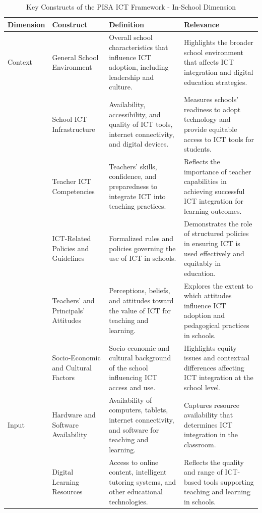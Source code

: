 \documentclass[
]{article}
\begin{document}
\begin{longtable}[l]{>{\raggedright\arraybackslash}p{1.5cm}>{\raggedright\arraybackslash}p{3.5cm}>{\raggedright\arraybackslash}p{5cm}>{\raggedright\arraybackslash}p{5cm}}
\caption{\label{tab:in_school_constructs}Key Constructs of the PISA ICT Framework - In-School Dimension}\\
\toprule
Dimension & Construct & Definition & Relevance\\
\midrule
Context & General School Environment & Overall school characteristics that influence ICT adoption, including leadership and culture. & Highlights the broader school environment that affects ICT integration and digital education strategies.\\
 & School ICT Infrastructure & Availability, accessibility, and quality of ICT tools, internet connectivity, and digital devices. & Measures schools' readiness to adopt technology and provide equitable access to ICT tools for students.\\
 & Teacher ICT Competencies & Teachers' skills, confidence, and preparedness to integrate ICT into teaching practices. & Reflects the importance of teacher capabilities in achieving successful ICT integration for learning outcomes.\\
 & ICT-Related Policies and Guidelines & Formalized rules and policies governing the use of ICT in schools. & Demonstrates the role of structured policies in ensuring ICT is used effectively and equitably in education.\\
 & Teachers’ and Principals’ Attitudes & Perceptions, beliefs, and attitudes toward the value of ICT for teaching and learning. & Explores the extent to which attitudes influence ICT adoption and pedagogical practices in schools.\\
\addlinespace
 & Socio-Economic and Cultural Factors & Socio-economic and cultural background of the school influencing ICT access and use. & Highlights equity issues and contextual differences affecting ICT integration at the school level.\\
Input & Hardware and Software Availability & Availability of computers, tablets, internet connectivity, and software for teaching and learning. & Captures resource availability that determines ICT integration in the classroom.\\
 & Digital Learning Resources & Access to online content, intelligent tutoring systems, and other educational technologies. & Reflects the quality and range of ICT-based tools supporting teaching and learning in schools.\\

\end{longtable}
\end{document}
